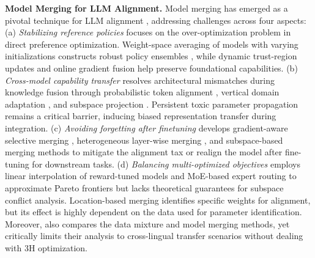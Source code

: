 \textbf{Model Merging for LLM Alignment.}
Model merging has emerged as a pivotal technique for LLM alignment \cite{yang2024model}, addressing challenges across four aspects:
(a) \textit{Stabilizing reference policies} focuses on the over-optimization problem in direct preference optimization. Weight-space averaging of models with varying initializations constructs robust policy ensembles \cite{chegini2024model}, while dynamic trust-region updates \cite{gorbatovski2024learn} and online gradient fusion \cite{lu2024online} help preserve foundational capabilities.
(b) \textit{Cross-model capability transfer} resolves architectural mismatches during knowledge fusion \cite{wan2024knowledge} through probabilistic token alignment \cite{yang2024weighted}, vertical domain adaptation \cite{lin2024dogerm}, and subspace projection \cite{thakkar2024combining}. Persistent toxic parameter propagation \cite{hammoud2024model} remains a critical barrier, inducing biased representation transfer during integration.
(c) \textit{Avoiding forgetting after finetuning} develops gradient-aware selective merging \cite{ju2024mitigating}, heterogeneous layer-wise merging \cite{lin2023speciality,lin2024mitigating}, and subspace-based merging \cite{yi2024safety} methods to mitigate the alignment tax or realign the model after fine-tuning for downstream tasks. (d) \textit{Balancing multi-optimized objectives} employs linear interpolation of reward-tuned models \cite{jang2023personalized,rame2024rewarded,rame2024warm,rame2024warp} and MoE-based expert routing \cite{tekin2024h} to approximate Pareto frontiers but lacks theoretical guarantees for subspace conflict analysis. Location-based merging \cite{zhao2024towards} identifies specific weights for alignment, but its effect is highly dependent on the data used for parameter identification. Moreover, \cite{ahmadian2024mix} also compares the data mixture and model merging methods, yet critically limits their analysis to cross-lingual transfer scenarios without dealing with 3H optimization.

